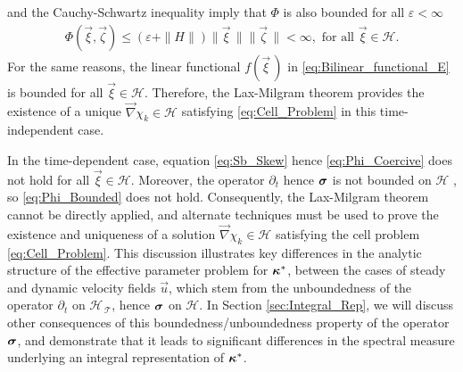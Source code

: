 \documentclass[11pt]{amsart}
\newcommand{\Tc}{\mathcal{T}}
\newcommand{\Hs}{\mathscr{H}}
\newcommand\bsig{\mbox{\boldmath${\sigma}$}}
\newcommand\bkappa{\mbox{\boldmath${\kappa}$}}
\begin{document}
and the Cauchy-Schwartz inequality imply that $\Phi$ is also bounded for
all $\varepsilon<\infty$
%
\begin{align}\label{eq:Phi_Bounded}
  \Phi(\vec{\xi},\vec{\zeta})\leq(\varepsilon+\|H\|)\|\vec{\xi}\,\|\|\vec{\zeta}\,\|<\infty,
  \text{ for all } \vec{\xi}\in\Hs.
\end{align}
%
For the same reasons, the linear functional $f(\vec{\xi}\,)$ in
\eqref{eq:Bilinear_functional_E} is bounded for all
$\vec{\xi}\in\Hs$. Therefore, the Lax-Milgram theorem
\cite{McOwen:2003:PDE} provides the existence of a unique
$\vec{\nabla}\chi_k\in\Hs$ satisfying \eqref{eq:Cell_Problem} in this
time-independent case. 


In the time-dependent case, equation \eqref{eq:Sb_Skew} hence
\eqref{eq:Phi_Coercive} does not hold for all $\vec{\xi}\in\Hs$. Moreover, 
the operator $\partial_t$ hence $\bsig$ is not bounded on $\Hs$
\cite{Reed-1980,Stakgold:BVP:2000}, so \eqref{eq:Phi_Bounded} does not
hold. Consequently, the Lax-Milgram theorem cannot be directly
applied, and alternate techniques  
\cite{Friedman:1969:PDE,Friedman:1969:PDE:Parabolic} must be used to
prove the existence and uniqueness of a solution $\vec{\nabla}\chi_k\in\Hs$ 
satisfying the cell problem \eqref{eq:Cell_Problem}. This discussion
illustrates key differences in the analytic structure of the effective
parameter problem for $\bkappa^*$, between the cases of steady and
dynamic velocity fields $\vec{u}$, which stem from the unboundedness
of the operator $\partial_t$ on $\Hs_{\,\Tc}$, hence $\bsig$ on $\Hs$. In Section
\ref{sec:Integral_Rep}, we will discuss other consequences of this
boundedness/unboundedness property of the operator $\bsig$, and
demonstrate that it leads to significant differences in the spectral
measure underlying an  integral representation of $\bkappa^*$.     
\end{document}
